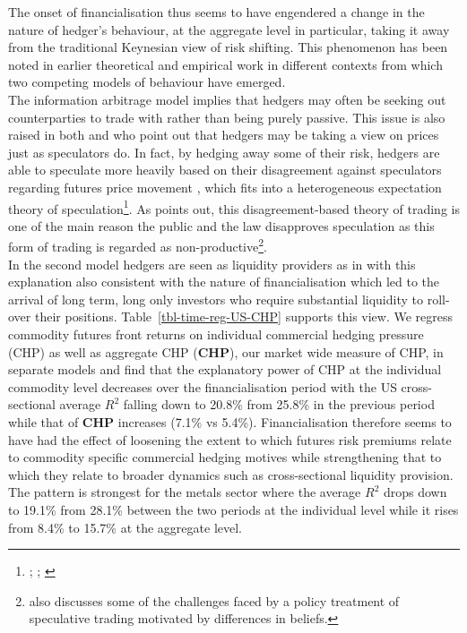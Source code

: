 \documentclass[
  authoryear,
  preprint,
  3p]{elsarticle}
\begin{document}
\medskip

The onset of financialisation thus seems to have engendered a change in
the nature of hedger's behaviour, at the aggregate level in particular,
taking it away from the traditional Keynesian view of risk shifting.
This phenomenon has been noted in earlier theoretical and empirical work
\citep{danthine_information_1978, stout_why_1998} in different contexts
from which two competing models of behaviour have emerged.\\
The information arbitrage model
\citep{grossman_impossibility_1980, danthine_information_1978, kyle_informed_1989}
implies that hedgers may often be seeking out counterparties to trade
with rather than being purely passive. This issue is also raised in both
\citet{cheng_financialisation_2014} and \citet{stulz_rethink_1996} who
point out that hedgers may be taking a view on prices just as
speculators do. In fact, by hedging away some of their risk, hedgers are
able to speculate more heavily based on their disagreement against
speculators regarding futures price movement
\citep{simsek_speculation_2013}, which fits into a heterogeneous
expectation theory of speculation\footnote{\citet{hirshleifer_speculation_1975};
  \citet{hirshleifer_reply_1976}; \citet{hirshleifer_theory_1977}}. As
\citet{stout_why_1998} points out, this disagreement-based theory of
trading is one of the main reason the public and the law disapproves
speculation as this form of trading is regarded as
non-productive\footnote{\citet{duffie_challenges_2014} also discusses
  some of the challenges faced by a policy treatment of speculative
  trading motivated by differences in beliefs.}.\\
In the second model hedgers are seen as liquidity providers as in
\citet{kang_tale_2020} with this explanation also consistent with the
nature of financialisation which led to the arrival of long term, long
only investors who require substantial liquidity to roll-over their
positions. Table~\ref{tbl-time-reg-US-CHP} supports this view. We
regress commodity futures front returns on individual commercial hedging
pressure (CHP) as well as aggregate CHP (\textbf{CHP}), our market wide
measure of CHP, in separate models and find that the explanatory power
of CHP at the individual commodity level decreases over the
financialisation period with the US cross-sectional average \(R^{2}\)
falling down to 20.8\% from 25.8\% in the previous period while that of
\textbf{CHP} increases (7.1\% vs 5.4\%). Financialisation therefore
seems to have had the effect of loosening the extent to which futures
risk premiums relate to commodity specific commercial hedging motives
while strengthening that to which they relate to broader dynamics such
as cross-sectional liquidity provision. The pattern is strongest for the
metals sector where the average \(R^{2}\) drops down to 19.1\% from
28.1\% between the two periods at the individual level while it rises
from 8.4\% to 15.7\% at the aggregate level.
\end{document}

